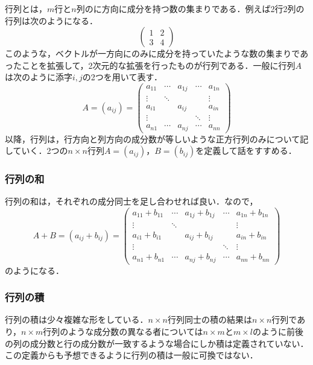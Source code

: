\documentclass[dvipdfmx,a4]{jsarticle}
\begin{document}
行列とは，\(m\)行と\(n\)列のに方向に成分を持つ数の集まりである．例えば2行2列の行列は次のようになる．
\begin{equation*}
  \begin{pmatrix}
    1 & 2 \\
    3 & 4 
  \end{pmatrix}
\end{equation*}
このような，ベクトルが一方向にのみに成分を持っていたような数の集まりであったことを拡張して，2次元的な拡張を行ったものが行列である．一般に行列\(A\)は次のように添字\(i,j\)の2つを用いて表す．
\begin{equation*}
  A= (a_{ij})=
  \begin{pmatrix}
    a_{11} & \cdots & a_{1j} & \cdots & a_{1n}\\
    \vdots & \ddots &        &        & \vdots \\
    a_{i1} &        & a_{ij} &        & a_{in} \\
    \vdots &        &        & \ddots & \vdots \\
    a_{n1} & \cdots & a_{nj} & \cdots & a_{nn}
    \end{pmatrix}
\end{equation*}
以降，行列は，行方向と列方向の成分数が等しいような正方行列のみについて記していく．2つの\(n\times n\)行列\(A=(a_{ij})\)，\(B=(b_{ij})\)を定義して話をすすめる．
\subsubsection{行列の和}
行列の和は，それぞれの成分同士を足し合わせれば良い．なので，
\begin{equation*}
  A+B= (a_{ij}+b_{ij})=
  \begin{pmatrix}
    a_{11} +b_{11} & \cdots & a_{1j}+b_{1j} & \cdots & a_{1n}+b_{1n}\\
    \vdots & \ddots &        &        & \vdots \\
    a_{i1} +b_{i1}&        & a_{ij} +b_{ij}&        & a_{in}+b_{in} \\
    \vdots &        &        & \ddots & \vdots \\
    a_{n1} +b_{n1}& \cdots & a_{nj} +b_{nj}& \cdots & a_{nn}+b_{nn}
    \end{pmatrix}
\end{equation*}
のようになる．

\subsubsection{行列の積}
行列の積は少々複雑な形をしている．\(n\times n\)行列同士の積の結果は\(n\times n\)行列であり，\(n\times m\)行列のような成分数の異なる者については\(n\times m\)と\(m\times l\)のように前後の列の成分数と行の成分数が一致するような場合にしか積は定義されていない．この定義からも予想できるように行列の積は一般に可換ではない．
\end{document}
